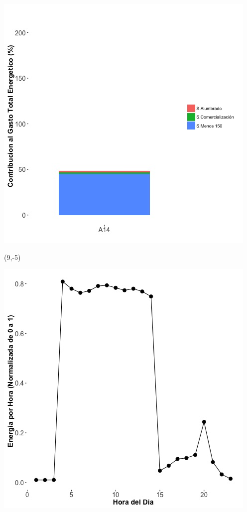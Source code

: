 \documentclass{article}\usepackage[]{graphicx}\usepackage[]{color}
\newenvironment{knitrout}{}{} %
\begin{document}
\begin{knitrout}
\color{fgcolor}
\includegraphics[scale=0.65]{figure/A14_subvars_plot.jpg} 
\end{knitrout}

 \begin{textblock}{1}(9,-5)
\begin{minipage}{20em}
\begingroup

\endgroup
\end{minipage}
\end{textblock}

\begin{knitrout}
\color{fgcolor}
\includegraphics[scale=0.65]{figure/A14_plot_norm_median} 
\end{knitrout}
\end{document}
